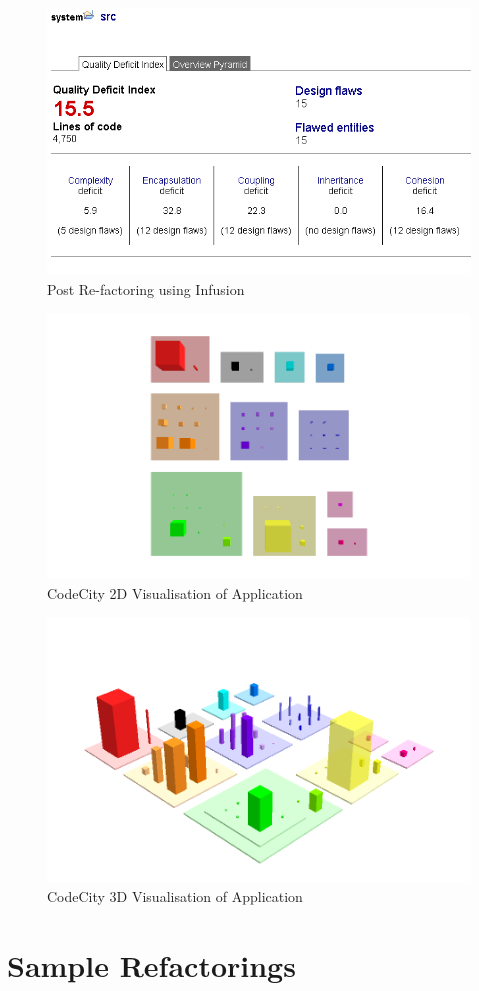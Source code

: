 \begin{figure}[H]
\begin{center}
\includegraphics[scale=0.7]{infusion2.PNG}
\caption{Post Re-factoring using Infusion}
\end{center}
\end{figure}

\begin{figure}[H]
\begin{center}
\includegraphics[scale=0.5]{codecity2d.png}
\caption{CodeCity 2D Visualisation of Application}
\end{center}
\end{figure}

\begin{figure}[H]
\begin{center}
\includegraphics[scale=0.5]{codecity3d.png}
\caption{CodeCity 3D Visualisation of Application}
\end{center}
\end{figure}



\section{Sample Refactorings}
